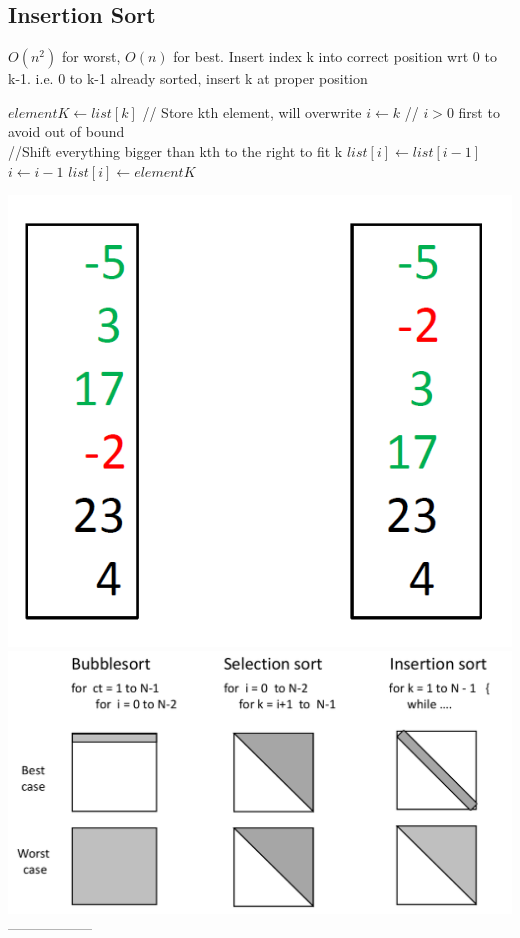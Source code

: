 \subsection{Insertion Sort} $O(n^2)$ for worst, $O(n)$ for best. Insert index k into correct position wrt 0 to k-1. i.e. 0 to k-1 already sorted, insert k at proper position
\begin{algorithmic}
		\State $elementK \gets list[k]$ // Store kth element, will overwrite
		\State $i \gets k$
		 // $i>0$ first to avoid out of bound
			\\//{Shift everything bigger than kth to the right to fit k}
			\State $list[i] \gets list[i-1]$
			\State $i \gets i-1$
		\EndWhile
		\State $list[i] \gets elementK$
	\EndFor 
\end{algorithmic}
\includegraphics[scale=0.1]{is}\\
\includegraphics[scale=0.13]{sort3}
\\------------------
